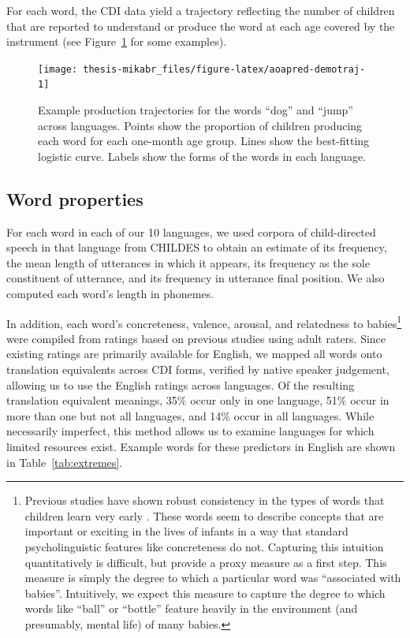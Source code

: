 \documentclass[
   11pt,
       ]{book}
\begin{document}
For each word, the CDI data yield a trajectory reflecting the number of children that are reported to understand or produce the word at each age covered by the instrument (see Figure~\ref{fig:aoapred-demotraj} for some examples).



\begin{figure}

{\centering \texttt{[image: thesis-mikabr\_files/figure-latex/aoapred-demotraj-1]} 

}

\caption{Example production trajectories for the words ``dog'' and ``jump'' across languages. Points show the proportion of children producing each word for each one-month age group. Lines show the best-fitting logistic curve. Labels show the forms of the words in each language.}\label{fig:aoapred-demotraj}
\end{figure}

\hypertarget{word-properties}{%
\subsection{Word properties}\label{word-properties}}

For each word in each of our 10 languages, we used corpora of child-directed speech in that language from CHILDES to obtain an estimate of its frequency, the mean length of utterances in which it appears, its frequency as the sole constituent of utterance, and its frequency in utterance final position. We also computed each word's length in phonemes.

In addition, each word's concreteness, valence, arousal, and relatedness to babies\footnote{Previous studies have shown robust consistency in the types of words that children learn very early \citep{tardif2008}. These words seem to describe concepts that are important or exciting in the lives of infants in a way that standard psycholinguistic features like concreteness do not. Capturing this intuition quantitatively is difficult, but \citet{perry2015} provide a proxy measure as a first step. This measure is simply the degree to which a particular word was ``associated with babies''. Intuitively, we expect this measure to capture the degree to which words like ``ball'' or ``bottle'' feature heavily in the environment (and presumably, mental life) of many babies.} were compiled from ratings based on previous studies using adult raters. Since existing ratings are primarily available for English, we mapped all words onto translation equivalents across CDI forms, verified by native speaker judgement, allowing us to use the English ratings across languages. Of the resulting translation equivalent meanings, 35\% occur only in one language, 51\% occur in more than one but not all languages, and 14\% occur in all languages. While necessarily imperfect, this method allows us to examine languages for which limited resources exist. Example words for these predictors in English are shown in Table~\ref{tab:extremes}.
\end{document}
